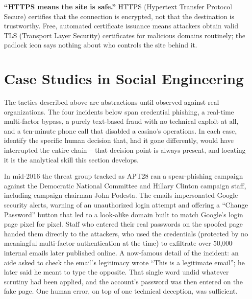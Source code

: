 \begin{misconception}
\textbf{``HTTPS means the site is safe.''} HTTPS (Hypertext Transfer Protocol Secure) certifies
that the connection is encrypted, not that the destination is trustworthy. Free, automated
certificate issuance means attackers obtain valid TLS (Transport Layer Security) certificates for
malicious domains routinely; the padlock icon says nothing about who controls the site behind it.
\end{misconception}

\section{Case Studies in Social Engineering}

The tactics described above are abstractions until observed against real organizations. The four
incidents below span credential phishing, a real-time multi-factor bypass, a purely text-based
fraud with no technical exploit at all, and a ten-minute phone call that disabled a casino's
operations. In each case, identify the specific human decision that, had it gone differently,
would have interrupted the entire chain -- that decision point is always present, and locating it
is the analytical skill this section develops.

\begin{example}
In mid-2016 the threat group tracked as APT28 ran a spear-phishing campaign against the Democratic
National Committee and Hillary Clinton campaign staff, including campaign chairman John Podesta.
The emails impersonated Google security alerts, warning of an unauthorized login attempt and
offering a ``Change Password'' button that led to a look-alike domain built to match Google's login
page pixel for pixel. Staff who entered their real passwords on the spoofed page handed them
directly to the attackers, who used the credentials (protected by no meaningful multi-factor
authentication at the time) to exfiltrate over 50,000 internal emails later published online. A
now-famous detail of the incident: an aide asked to check the email's legitimacy wrote ``This is a
legitimate email''; he later said he meant to type the opposite. That single word undid whatever
scrutiny had been applied, and the account's password was then entered on the fake page. One human error, on top of one technical deception,
was sufficient.
\end{example}

